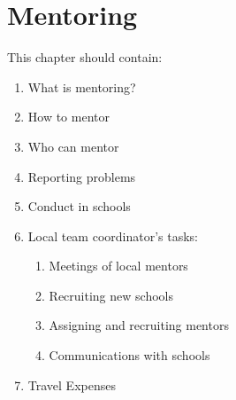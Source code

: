 \chapter{Mentoring}

This chapter should contain:
\begin{enumerate}
\item What is mentoring?
\item How to mentor
\item Who can mentor
\item Reporting problems
\item Conduct in schools
\item Local team coordinator's tasks:
  \begin{enumerate}
  \item Meetings of local mentors
  \item Recruiting new schools
  \item Assigning and recruiting mentors
  \item Communications with schools
  \end{enumerate}
\item Travel Expenses
\end{enumerate}
